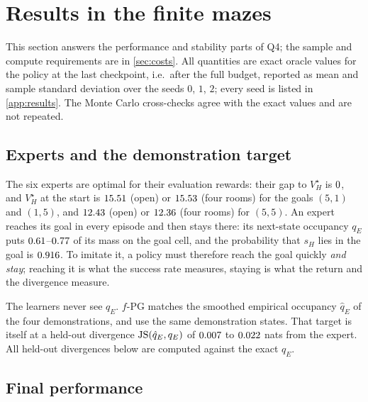 \section{Results in the finite mazes}\label{sec:results-finite}

This section answers the performance and stability parts of Q4; the sample and compute requirements are in \cref{sec:costs}.
All quantities are exact oracle values for the policy at the last checkpoint, i.e.\ after the full budget, reported as mean and sample standard deviation over the seeds $0$, $1$, $2$; every seed is listed in \cref{app:results}.
The Monte Carlo cross-checks agree with the exact values and are not repeated.

\subsection{Experts and the demonstration target}

The six experts are optimal for their evaluation rewards: their gap to $V^\star_H$ is $\vn{s11.expert_gap}{0}$, and $V^\star_H$ at the start is $\vn{s11.V.open.side}{15.51}$ (open) or $\vn{s11.V.4r.side}{15.53}$ (four rooms) for the goals $(5,1)$ and $(1,5)$, and $\vn{s11.V.open55}{12.43}$ (open) or $\vn{s11.V.4r55}{12.36}$ (four rooms) for $(5,5)$.
An expert reaches its goal in every episode and then stays there: its next-state occupancy $q_E$ puts $\vn{s11.goalmass.lo}{0.61}$--$\vn{s11.goalmass.hi}{0.77}$ of its mass on the goal cell, and the probability that $s_H$ lies in the goal is $\vn{s11.expert_fig}{0.916}$.
To imitate it, a policy must therefore reach the goal quickly \emph{and stay}; reaching it is what the success rate measures, staying is what the return and the divergence measure.

The learners never see $q_E$. $f$-PG matches the smoothed empirical occupancy $\hat q_E$ of the four demonstrations, \ERFB{} and \DMFB{} use the same demonstration states. That target is itself at a held-out divergence $\JS(\hat q_E,q_E)$ of $\vn{s11.demo_target.lo}{0.007}$ to $\vn{s11.demo_target.hi}{0.022}$ nats from the expert. All held-out divergences below are computed against the exact $q_E$.

\subsection{Final performance}

\begin{table}[ht]
\centering\small
\caption{Finite mazes, core suite, last checkpoint (mean $\pm$ sample SD over 3 seeds). JS is the held-out next-state occupancy divergence $\JS(d^+_{\pi,H},q_E)$, success the exact probability of reaching the goal within $H$ steps, the gap is $V^\star_H-J_H(\pi)$ for the evaluation reward, and $\JS^{\SA}$ the state--action diagnostic. Generated from the run files by \texttt{report/verify/make\_tables.py}.}\label{tab:finite}
\resizebox{\textwidth}{!}{}
\end{table}

